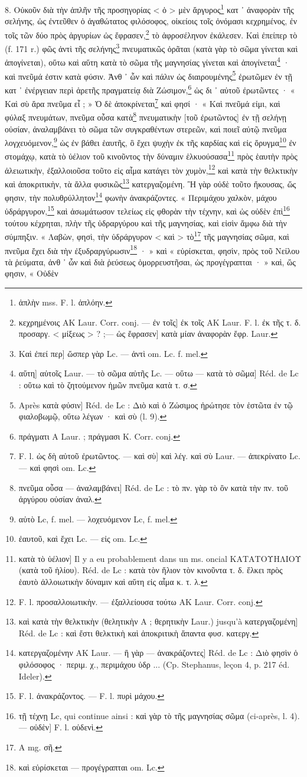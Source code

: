 \documentclass[a4paper, 11pt, oneside, polutonikogreek, french]{article}
\begin{document}
8. Οὐκοῦν διὰ τὴν ἁπλῆν τῆς προσηγορίας < ὁ > μὲν ἄργυρος\footnote{ἁπλὴν mss. F. l. ἁπλόην.} κατ ᾽ ἀναφορὰν τῆς σελήνης, ὡς ἐντεῦθεν ὁ ἀγαθώτατος φιλόσοφος, οἰκείοις τοῖς ὀνόμασι κεχρημένος, ἐν τοῖς τῶν δύο πρὸς ἀργυρίων ὡς ἔφρασεν,\footnote{κεχρημένοις AK Laur. Corr. conj. --- ἐν τοῖς] ἐκ τοῖς AK Laur. F. l. ἐκ τῆς τ. δ. προσαργ. < μίξεως > ? ;--- ὡς ἔφρασεν] κατὰ μίαν ἀναφορὰν ἔφρ. Laur.} τὸ ἀφροσέληνον ἐκάλεσεν. Καὶ ἐπείπερ τὸ (f. 171 r.) φῶς ἀντὶ τῆς σελήνης\footnote{Καὶ ἐπεί περ] ὥσπερ γὰρ Lc. --- ἀντὶ om. Lc. f. mel.} πνευματικῶς ὁρᾶται (κατὰ γὰρ τὸ σῶμα γίνεται καὶ ἀπογίνεται), οὕτω καὶ αὕτη κατὰ τὸ σῶμα τῆς μαγνησίας γίνεται καὶ ἀπογίνεται\footnote{αὕτη] αὐτοῖς Laur. --- τὸ σῶμα αὐτῆς Lc. --- οὕτω --- κατὰ τὸ σῶμα] Réd. de Lc : οὕτω καὶ τὸ ζητούμενον ἡμῶν πνεῦμα κατὰ τ. σ.} · καὶ πνεῦμά ἐστιν κατὰ φύσιν. Ἀνθ ᾽ ὧν καὶ πάλιν ὡς διαιρουμένης\footnote{Après κατὰ φύσιν] Réd. de Lc : Διὸ καὶ ὁ Ζώσιμος ἠρώτησε τὸν ἑστῶτα ἐν τῷ φιαλοβωμῷ, οὕτω λέγων · καὶ σὺ (l. 9).} ἐρωτῶμεν ἐν τῇ κατ ᾽ ἐνέργειαν περὶ ἀρετῆς πραγματείᾳ διὰ Ζώσιμον,\footnote{πράγματι A Laur. ; πράγμασι K. Corr. conj.} ὡς δι ᾽ αὐτοῦ ἐρωτῶντες · « Καὶ σὺ ἄρα πνεῦμα εἶ ; » Ὁ δὲ ἀποκρίνεται\footnote{F. l. ὡς δὴ αὐτοῦ ἐρωτῶντος. --- καὶ σὺ] καὶ λέγ. καὶ σὺ Laur. --- ἀπεκρίνατο Lc. --- καὶ φησὶ om. Lc.} καὶ φησί · « Καὶ πνεῦμά εἰμι, καὶ φύλαξ πνευμάτων, πνεῦμα οὖσα κατὰ\footnote{πνεῦμα οὖσα --- ἀναλαμβάνει] Réd. de Lc : τὸ πν. γὰρ τὸ ὂν κατὰ τὴν πν. τοῦ ἀργύρου οὐσίαν ἀναλ.} πνευματικὴν [τοῦ ἐρωτῶντος] ἐν τῇ σελήνῃ οὐσίαν, ἀναλαμβάνει τὸ σῶμα τῶν συγκραθέντων στερεῶν, καὶ ποιεῖ αὐτῷ πνεῦμα λογχευόμενον,\footnote{αὐτὸ Lc, f. mel. --- λοχευόμενον Lc, f. mel.} ὡς ἐν βάθει ἑαυτῆς, ὃ ἔχει ψυχὴν ἐκ τῆς καρδίας καὶ εἰς ὄρυγμα\footnote{ἐαυτοῦ, καὶ ἔχει Lc. --- εἰς om. Lc.} ἐν στομάχῳ, κατὰ τὸ ὑέλιον τοῦ κινοῦντος τὴν δύναμιν ἑλκυούσασα\footnote{κατὰ τὸ ὑέλιον] Il y a eu probablement dans un ms. oncial ΚΑΤΑΤΟΥΗΛΙΟΥ (κατὰ τοῦ ἡλίου). Réd. de Lc : κατὰ τὸν ἥλιον τὸν κινοῦντα τ. δ. ἕλκει πρὸς ἑαυτὸ ἀλλοιωτικὴν δύναμιν καὶ αὕτη εἰς αἷμα κ. τ. λ.} πρὸς ἑαυτὴν πρὸς ἀλειωτικὴν, ἐξαλλοιοῦσα τοῦτο εἰς αἷμα κατάγει τὸν χυμὸν,\footnote{F. l. προσαλλοιωτικὴν. --- ἐξαλλείουσα τούτω AK Laur. Corr. conj.} καὶ κατὰ τὴν θελκτικὴν καὶ ἀποκριτικὴν, τὰ ἄλλα φυσικῶς\footnote{καὶ κατὰ τὴν θελκτικὴν (θελητικὴν A ; θερητικὴν Laur.) jusqu'à κατεργαζομένη] Réd. de Lc : καὶ ἔστι θελκτικὴ καὶ ἀποκριτικὴ ἅπαντα φυσ. κατεργ.} κατεργαζομένη. Ἢ γὰρ οὐδὲ τοῦτο ἤκουσας, ὥς φησιν, τὴν πολυθρύλλητον\footnote{κατεργαζομένην AK Laur. --- ἢ γὰρ --- ἀνακράζοντες] Réd. de Lc : Διὸ φησὶν ὁ φιλόσοφος · περιμ. χ., περιμάχου ὑδρ ... (Cp. Stephanus, leçon 4, p. 217 éd. Ideler).} φωνὴν ἀνακράζοντες. « Περιμάχου χαλκὸν, μάχου ὑδράργυρον,\footnote{F. l. ἀνακράζοντος. --- F. l. πυρὶ μάχου.} καὶ ἀσωμάτωσον τελείως εἰς φθορὰν τὴν τέχνην, καὶ ὡς οὐδὲν ἐπὶ\footnote{τῇ τέχνῃ Lc, qui continue ainsi : καὶ γὰρ τὸ τῆς μαγνησίας σῶμα (ci-après, l. 4). --- οὐδὲν] F. l. οὐδενὶ.} τούτου κέχρηται, πλὴν τῆς ὑδραργύρου καὶ τῆς μαγνησίας, καὶ εἰσὶν ἄμφω διὰ τὴν σύμπηξιν. « Λαβὼν, φησὶ, τὴν ὑδράργυρον < καὶ > τὸ\footnote{A mg. σῆ.} τῆς μαγνησίας σῶμα, καὶ πνεῦμα ἔχει διὰ τὴν ἐξυδραργύρωσιν\footnote{καὶ εὑρίσκεται --- προγέγραπται om. Lc.} · » καὶ « εὑρίσκεται, φησὶν, πρὸς τοῦ Νείλου τὰ ῥεύματα, ἀνθ ᾽ ὧν καὶ διὰ ῥεύσεως ὁμορρευστῆσαι, ὡς προγέγραπται · » καὶ, ὥς φησιν, « Οὐδὲν 
\end{document}
